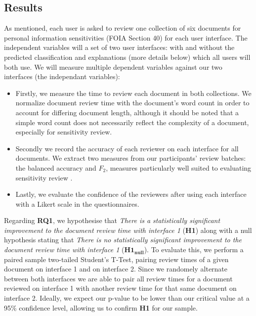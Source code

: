 \documentclass[\version]{l4proj}
\begin{document}
\subsection{Results}

As mentioned, each user is asked to review one collection of six documents for personal information sensitivities (FOIA Section 40) for each user interface.
The independent variables will a set of two user interfaces: with and without the predicted classification and explanations (more details below) which all users will both use. We will measure multiple dependent variables against our two interfaces (the independant variables):

\begin{itemize}
    \item Firstly, we measure the time to review each document in both collections.
          We normalize document review time with the document's word count in order to account for differing document length, although it should be noted that a simple word count does not necessarily reflect the complexity of a document, especially for sensitivity review.
    \item Secondly we record the accuracy of each reviewer on each interface for all documents.
          We extract two measures from our participants' review batches: the balanced accuracy and \(F_{2}\), measures particularly well suited to evaluating sensitivity review \autocite{mcdonaldStudySVMKernel2017}.
    \item Lastly, we evaluate the confidence of the reviewers after using each interface with a Likert scale in the questionnaires.
\end{itemize}

Regarding \textbf{RQ1}, we hypothesise that \textit{There is a statistically significant improvement to the document review time with interface 1} (\textbf{H1}) along with a null hypothesis stating that \textit{There is no statistically significant improvement to the document review time with interface 1} (\(\mathbf{H1_{null}}\)).
To evaluate this, we perform a paired sample two-tailed Student's T-Test, pairing review times of a given document on interface 1 and on interface 2.
Since we randomely alternate between both interfaces we are able to pair all review times for a document reviewed on interface 1 with another review time for that same document on interface 2.
Ideally, we expect our p-value to be lower than our critical value at a 95\% confidence level, allowing us to confirm \textbf{H1} for our sample.
\end{document}
